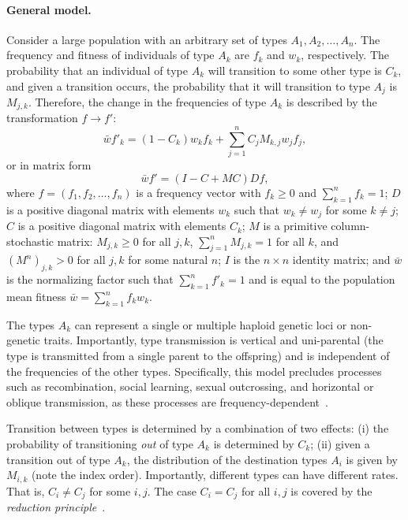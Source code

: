\documentclass[9pt, a4paper, twocolumn]{extarticle}
\newcommand{\ci}{I}
\begin{document}
\paragraph*{General model.}\label{sec:general_model}
Consider a large  population with an arbitrary set of types $A_1, A_2, \ldots, A_n$.
The frequency and fitness of individuals of type $A_k$ are $f_k$ and $w_k$, respectively.
The probability that an individual of type $A_k$ will transition to some other type is $C_k$, and given a transition occurs, the probability that it will transition to type $A_j$ is $M_{j,k}$.
Therefore, the change in the frequencies of type $A_k$ is described by the transformation $f \to f'$: 
\begin{equation}
\bar{w} f'_k = (1-C_k) w_k f_k + \sum_{j=1}^{n}{C_j M_{k,j} w_j f_j},
\label{eq:model_sum}
\end{equation}
or in matrix form
\begin{equation}
\bar{w} f' = (\ci - C + MC)D f,
\label{eq:model}
\end{equation}
where $f=(f_1, f_2, \ldots, f_n)$ is a frequency vector with $f_k\ge 0$ and  $\sum_{k=1}^n{f_k} = 1$;
$D$ is a positive diagonal matrix with  elements $w_k$ such that $w_k \ne w_j$ for some $k \ne j$; 
$C$ is a positive diagonal  matrix with  elements $C_k$;
$M$ is a primitive column-stochastic matrix: $M_{j,k} \ge 0$ for all $j,k$, $\sum_{j=1}^n {M_{j,k}} = 1$ for all $k$, and $(M^n)_{j,k} > 0$ for all $j,k$ for some natural $n$;
$\ci$ is the $n\times n$ identity matrix;
and $\bar{w}$ is the normalizing factor such that $\sum_{k=1}^n{f'_k}=1$ and is equal to the population mean fitness $\bar w=\sum_{k=1}^n f_kw_k$.

The types $A_k$ can represent a single or multiple haploid genetic loci or non-genetic traits.
Importantly, type transmission is vertical and uni-parental (the type is transmitted from a single parent to the offspring) and is independent of the frequencies of the other types.
Specifically, this model precludes processes such as recombination, social learning, sexual outcrossing, and horizontal or oblique transmission, as these processes are frequency-dependent~\cite[pg.~54]{Cavalli-Sforza1981}.

Transition between types is determined by a combination of two effects:
(i) the probability of transitioning \emph{out} of type $A_k$ is determined by $C_k$;
(ii) given a transition out of type $A_k$, the distribution of the destination types $A_i$ is given by $M_{i,k}$ (note the index order).
Importantly, different types can have different rates.
That is, $C_i \ne C_j$ for some $i,j$. The case $C_i = C_j$ for all $i,j$ is covered by the \emph{reduction principle}~\citep[see][]{Altenberg2017}.
\end{document}
